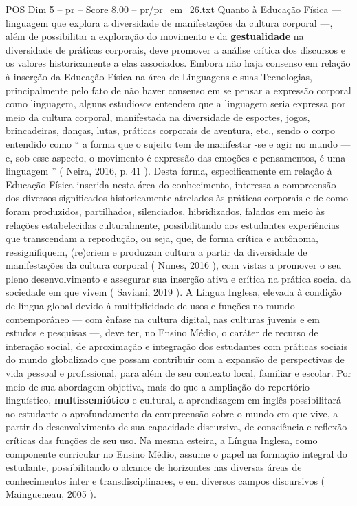 \begin{textsample}{POS Dim 5 – pr – Score 8.00 – pr/pr\_em\_26.txt}
Quanto à Educação Física — linguagem que explora a diversidade de manifestações da cultura corporal —, além de possibilitar a exploração do movimento e da \textbf{gestualidade} na diversidade de práticas corporais, deve promover a análise crítica dos discursos e os valores historicamente a elas associados.
Embora não haja consenso em relação à inserção da Educação Física na área de Linguagens e suas Tecnologias, principalmente pelo fato de não haver consenso em se pensar a expressão corporal como linguagem, alguns estudiosos entendem que a linguagem seria expressa por meio da cultura corporal, manifestada na diversidade de esportes, jogos, brincadeiras, danças, lutas, práticas corporais de aventura, etc., sendo o corpo entendido como “ a forma que o sujeito tem de manifestar -se e agir no mundo — e, sob esse aspecto, o movimento é expressão das emoções e pensamentos, é uma linguagem ” ( Neira, 2016, p. 41 ).
Desta forma, especificamente em relação à Educação Física inserida nesta área do conhecimento, interessa a compreensão dos diversos significados historicamente atrelados às práticas corporais e de como foram produzidos, partilhados, silenciados, hibridizados, falados em meio às relações estabelecidas culturalmente, possibilitando aos estudantes experiências que transcendam a reprodução, ou seja, que, de forma crítica e autônoma, ressignifiquem, (re)criem e produzam cultura a partir da diversidade de manifestações da cultura corporal ( Nunes, 2016 ), com vistas a promover o seu pleno desenvolvimento e assegurar sua inserção ativa e crítica na prática social da sociedade em que vivem ( Saviani, 2019 ).
A Língua Inglesa, elevada à condição de língua global devido à multiplicidade de usos e funções no mundo contemporâneo — com ênfase na cultura digital, nas culturas juvenis e em estudos e pesquisas —, deve ter, no Ensino Médio, o caráter de recurso de interação social, de aproximação e integração dos estudantes com práticas sociais do mundo globalizado que possam contribuir com a expansão de perspectivas de vida pessoal e profissional, para além de seu contexto local, familiar e escolar.
Por meio de sua abordagem objetiva, mais do que a ampliação do repertório linguístico, \textbf{multissemiótico} e cultural, a aprendizagem em inglês possibilitará ao estudante o aprofundamento da compreensão sobre o mundo em que vive, a partir do desenvolvimento de sua capacidade discursiva, de consciência e reflexão críticas das funções de seu uso.
Na mesma esteira, a Língua Inglesa, como componente curricular no Ensino Médio, assume o papel na formação integral do estudante, possibilitando o alcance de horizontes nas diversas áreas de conhecimentos inter e transdisciplinares, e em diversos campos discursivos ( Maingueneau, 2005 ).

\end{textsample}
